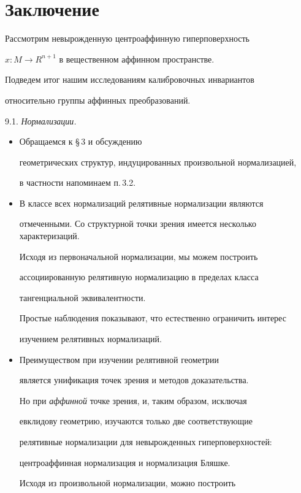 \section{Заключение}



Рассмотрим невырожденную центроаффинную гиперповерхность

$x: M \to R^{n+1}$ в вещественном аффинном пространстве.

Подведем итог нашим исследованиям калибровочных инвариантов

относительно группы аффинных преобразований.

\medskip



9.1. {\it Нормализации.}

\begin{itemize}

\item[(i)] Обращаемся к \S\,3 и обсуждению

геометрических структур, индуцированных произвольной нормализацией,

в частности напоминаем п.\,3.2.

\item[(ii)] В классе всех нормализаций релятивные нормализации являются 

отмеченными. Со структурной точки зрения имеется несколько характеризаций.

Исходя из первоначальной нормализации, мы можем построить

ассоциированную релятивную нормализацию в пределах класса

тангенциальной эквивалентности.

Простые наблюдения показывают, что естественно ограничить интерес

изучением релятивных нормализаций.

\item[(iii)] Преимуществом при изучении релятивной геометрии

является унификация точек зрения и методов доказательства.

Но при {\it аффинной} точке зрения, и, таким образом, исключая

евклидову геометрию, изучаются только две соответствующие

релятивные нормализации для невырожденных гиперповерхностей:

центроаффинная нормализация и нормализация Бляшке.

Исходя из произвольной нормализации, можно построить


\end{itemize}

